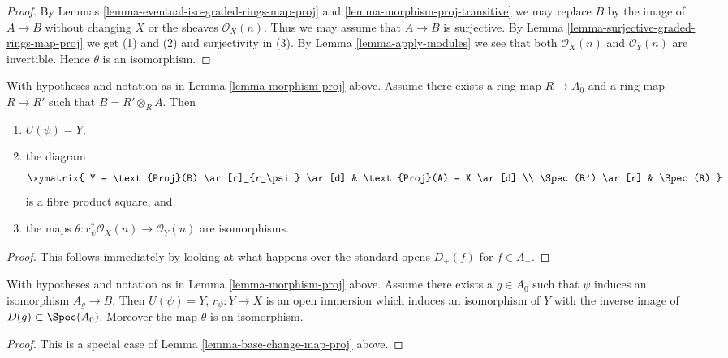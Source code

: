\begin{proof}
By Lemmas \ref{lemma-eventual-iso-graded-rings-map-proj} and
\ref{lemma-morphism-proj-transitive}
we may replace $B$ by the image of $A \to B$
without changing $X$ or the sheaves $\mathcal{O}_X(n)$.
Thus we may assume that $A \to B$ is surjective. By
Lemma \ref{lemma-surjective-graded-rings-map-proj} we get (1) and (2)
and surjectivity in (3).
By Lemma \ref{lemma-apply-modules} we see that both
$\mathcal{O}_X(n)$ and $\mathcal{O}_Y(n)$
are invertible. Hence $\theta$ is an isomorphism.
\end{proof}

\begin{lemma}
\label{lemma-base-change-map-proj}
\begin{reference}
\cite[II, Proposition 2.8.10]{EGA}
\end{reference}
With hypotheses and notation as in Lemma \ref{lemma-morphism-proj} above.
Assume there exists a ring map $R \to A_0$ and a ring map
$R \to R'$ such that $B = R' \otimes_R A$. Then
\begin{enumerate}
\item $U(\psi) = Y$,
\item the diagram
$$
\xymatrix{
Y = \text{Proj}(B) \ar[r]_{r_\psi} \ar[d] &
\text{Proj}(A) = X \ar[d] \\
\Spec(R') \ar[r] &
\Spec(R)
}
$$
is a fibre product square, and
\item the maps $\theta : r_\psi^*\mathcal{O}_X(n) \to \mathcal{O}_Y(n)$
are isomorphisms.
\end{enumerate}
\end{lemma}

\begin{proof}
This follows immediately by looking at what happens over the standard
opens $D_{+}(f)$ for $f \in A_{+}$.
\end{proof}

\begin{lemma}
\label{lemma-localization-map-proj}
With hypotheses and notation as in Lemma \ref{lemma-morphism-proj} above.
Assume there exists a $g \in A_0$ such that $\psi$ induces an
isomorphism $A_g \to B$. Then
$U(\psi) = Y$, $r_\psi : Y \to X$ is an open immersion
which induces an isomorphism of $Y$ with the inverse image
of $D(g) \subset \Spec(A_0)$. Moreover the map $\theta$
is an isomorphism.
\end{lemma}

\begin{proof}
This is a special case of Lemma \ref{lemma-base-change-map-proj} above.
\end{proof}


